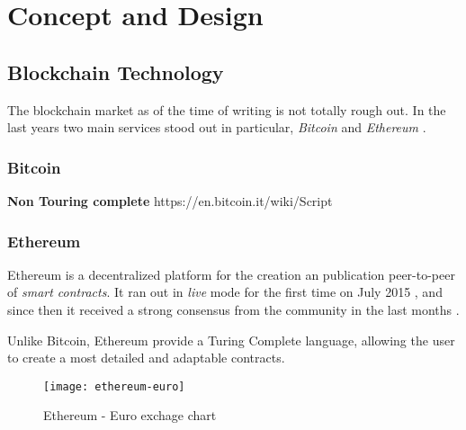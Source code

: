 \chapter{Concept and Design}
\label{chapter:concept}


\section{Blockchain Technology}

The blockchain market as of the time of writing is not totally rough out. In the last years two main services stood out in particular, \textit{Bitcoin} \citep{BitcoinMainPage} and \textit{Ethereum} \citep{EthereumMainPage}.

\subsection{Bitcoin}

\textbf{Non Touring complete} https://en.bitcoin.it/wiki/Script


\subsection{Ethereum}
Ethereum is a decentralized platform for the creation an publication peer-to-peer of \textit{smart contracts}.
It ran out in \textit{live} mode for the first time on July 2015 \citep{EthereumLaunch}, and since then it received a strong consensus from the community in the last months \citep{EthereumEuroChart}.

Unlike Bitcoin, Ethereum provide a Turing Complete language, allowing the user to create a most detailed and adaptable contracts.

\begin{figure}[ht]
  \vspace{2em}
	\centering
  \texttt{[image: ethereum-euro]}
	\caption{Ethereum - Euro exchage chart}
	\label{fig1}
\end{figure}
